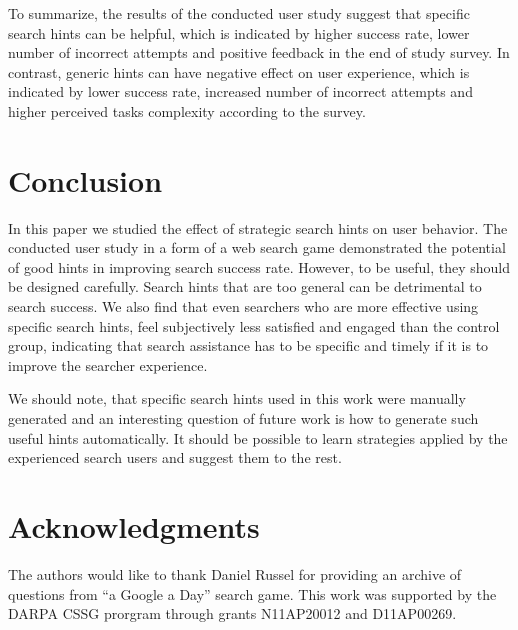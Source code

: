 \documentclass{sig-alternate}
\begin{document}
To summarize, the results of the conducted user study suggest that specific search hints can be helpful, which is indicated by higher success rate, lower number of incorrect attempts and positive feedback in the end of study survey.
In contrast, generic hints can have negative effect on user experience, which is indicated by lower success rate, increased number of incorrect attempts and higher perceived tasks complexity according to the survey.

\vspace{-1mm}
\section{Conclusion}
In this paper we studied the effect of strategic search hints on user behavior. 
The conducted user study in a form of a web search game demonstrated the potential of good hints in improving search success rate.
However, to be useful, they should be designed carefully.
Search hints that are too general can be detrimental to search success.
We also find that even searchers who are more effective using specific search hints, feel subjectively less satisfied and engaged than the control group, indicating that search assistance has to be specific and timely if it is to improve the searcher experience.

We should note, that specific search hints used in this work were manually generated and an interesting question of future work is how to generate such useful hints automatically.
It should be possible to learn strategies applied by the experienced search users and suggest them to the rest.


\vspace{-1mm}
\section{Acknowledgments}
The authors would like to thank Daniel Russel for providing an archive of questions from ``a Google a Day'' search game. This work was supported by the DARPA CSSG prorgram through grants N11AP20012 and D11AP00269.

%

%
%
\end{document}
